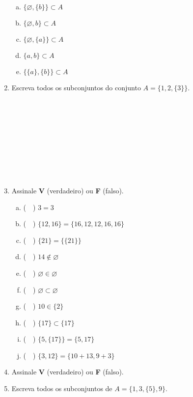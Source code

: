 \documentclass[a4paper,14pt]{article}
\begin{document}
\begin{multicols}{2}
\begin{enumerate}
			\begin{enumerate}[a)]
				\item $\{\varnothing, \{b\}\} \subset A$
				\item $\{\varnothing, b\} \subset A$
				\item $\{\varnothing, \{a\}\} \subset A$
				\item $\{a, b\} \subset A$
				\item $\{\{a\}, \{b\}\} \subset A$
			\end{enumerate}
			\item Escreva todos os subconjuntos do conjunto $A = \{1, 2, \{3\}\}$. \\\\\\\\\\\\\\\\\\\\
			\item Assinale \textbf{V} (verdadeiro) ou \textbf{F} (falso).
			\begin{enumerate}[a)]
				\item (~~) $3 = 3$
				\item (~~) $\{12, 16\} = \{16, 12, 12, 16, 16\}$
				\item (~~) $\{21\} = \{\{21\}\}$
				\item (~~) $14 \not\in \varnothing$
				\item (~~) $\varnothing \in \varnothing$
				\item (~~) $\varnothing \subset \varnothing$
				\item (~~) $10 \in \{2\}$
				\item (~~) $\{17\} \subset \{17\}$
				\item (~~) $\{5, \{17\}\} = \{5, 17\}$
				\item (~~) $\{3, 12\} = \{10 + 13, 9 + 3\}$
			\end{enumerate}
			\item Assinale \textbf{V} (verdadeiro) ou \textbf{F} (falso).
			\item Escreva todos os subconjuntos de $A = \{1, 3, \{5\}, 9\}$. \\\\\\\\\\\\\\\\\\\\

\end{enumerate}
\end{multicols}
\end{document}
